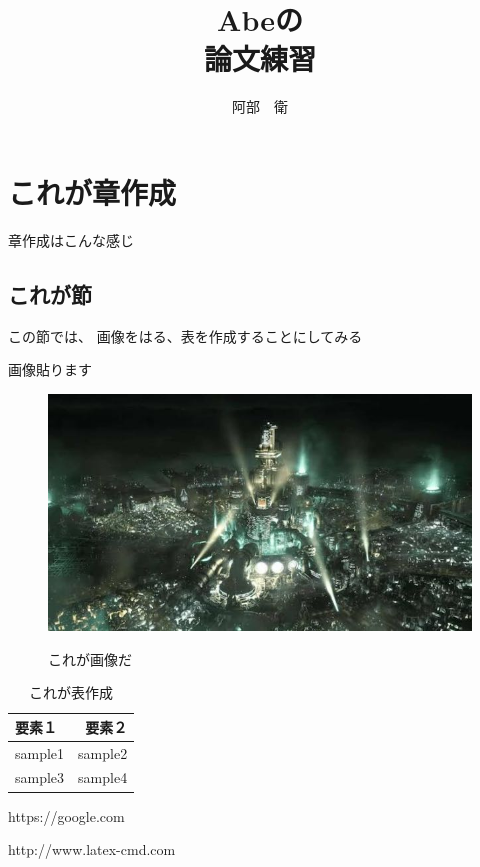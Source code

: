 \documentclass[dvipdfmx]{jsarticle}
\begin{document}
\title{Abeの\\論文練習}
\author{阿部　衛}
\maketitle{\title}
\thispagestyle{empty}
\newpage 


\section{これが章作成}
章作成はこんな感じ
\subsection{これが節}
この節では、
画像をはる、表を作成することにしてみる

画像貼ります
\begin{figure}[h]
   \begin{center}
     \caption{これが画像だ}
     \includegraphics[scale=0.5]{FF7R_zoom.jpg}
　\end{center}
\end{figure}



\begin{table}[h]
 \caption{これが表作成}
 \centering
  \begin{tabular}{|l|r|} \hline
   要素１&要素２\\ \hline \hline
   sample1&sample2\\
   sample3&sample4\\ \hline
\end{tabular}
\end{table}


\newpage 
\begin{thebibliography}{99}
\item
  https://google.com 
\item
 http://www.latex-cmd.com
\end{thebibliography}
\end{document}
